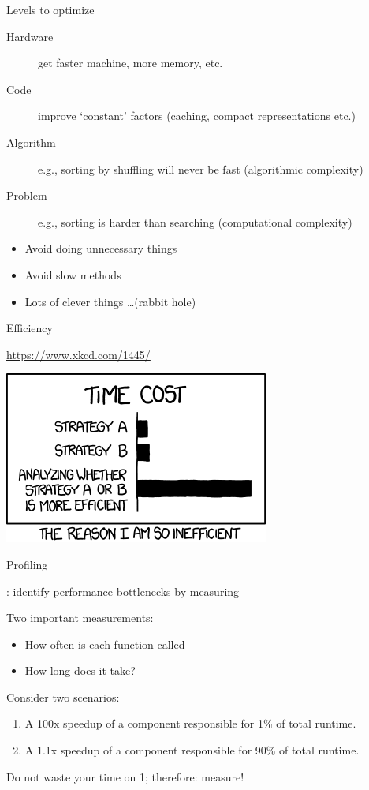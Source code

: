 \documentclass[aspectratio=169,usenames,dvipsnames]{beamer}
\begin{document}
\begin{frame}{Levels to optimize}
    \begin{description}
        \item[Hardware] get faster machine, more memory, etc.
        \item[Code] improve `constant' factors (caching, compact representations etc.)
        \item[Algorithm] e.g., sorting by shuffling will never be fast (algorithmic complexity)
        \item[Problem] e.g., sorting is harder than searching (computational complexity)
    \end{description}

    \pause
	\begin{itemize}
		\item Avoid doing unnecessary things
		\item Avoid slow methods
        \item Lots of clever things \dots (rabbit hole)
	\end{itemize}
\end{frame}

\begin{frame}{Efficiency}
    \begin{reference}
        \url{https://www.xkcd.com/1445/}
    \end{reference}
    \centering\includegraphics[height=0.6\textheight]{fig/xkcdefficiency}
\end{frame}


\begin{frame}{Profiling}
	\begin{definition}
		: identify performance bottlenecks by measuring
	\end{definition}
    
    Two important measurements:
    \begin{itemize}
        \item How often is each function called
        \item How long does it take?
    \end{itemize}

    \pause
    Consider two scenarios:
    \begin{enumerate}
        \item A 100x speedup of a component responsible for 1\% of total runtime.
        \item A 1.1x speedup of a component responsible for 90\% of total runtime.
    \end{enumerate}
    Do not waste your time on 1; therefore: measure!
\end{frame}
\end{document}
